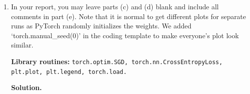\documentclass{article}
\theoremstyle{definition}
\theoremstyle{remark}
\newenvironment{Q}
{%
\clearpage
\item
}
{%
\phantom{s} %
\bigskip
\textbf{Solution.}
}
\begin{document}
\begin{enumerate}[font={\Large\bfseries},left=0pt]
\begin{Q}
\begin{enumerate}
            \vspace{1.5mm}In your report, you may leave parts (c) and (d) blank and include all comments in part (e). Note that it is normal to get different plots for separate runs as PyTorch randomly initializes the weights. We added `torch.manual\_seed(0)' in the coding template to make everyone's plot look similar.
            
            \vspace{1.5mm}\textbf{Library routines:} \texttt{torch.optim.SGD, torch.nn.CrossEntropyLoss, plt.plot, plt.legend, torch.load.}
    \end{enumerate}\end{Q}
    \begin{tcolorbox}

    \end{tcolorbox}


 
    
\end{enumerate}

\newpage

\end{document}
